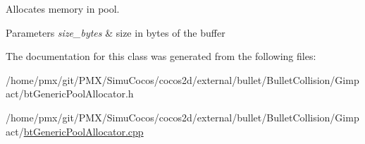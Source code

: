 Allocates memory in pool. 


\begin{DoxyParams}{Parameters}
{\em size\+\_\+bytes} & size in bytes of the buffer \\
\hline
\end{DoxyParams}


The documentation for this class was generated from the following files\+:\begin{DoxyCompactItemize}
\item 
/home/pmx/git/\+P\+M\+X/\+Simu\+Cocos/cocos2d/external/bullet/\+Bullet\+Collision/\+Gimpact/bt\+Generic\+Pool\+Allocator.\+h\item 
/home/pmx/git/\+P\+M\+X/\+Simu\+Cocos/cocos2d/external/bullet/\+Bullet\+Collision/\+Gimpact/\hyperlink{btGenericPoolAllocator_8cpp}{bt\+Generic\+Pool\+Allocator.\+cpp}\end{DoxyCompactItemize}
